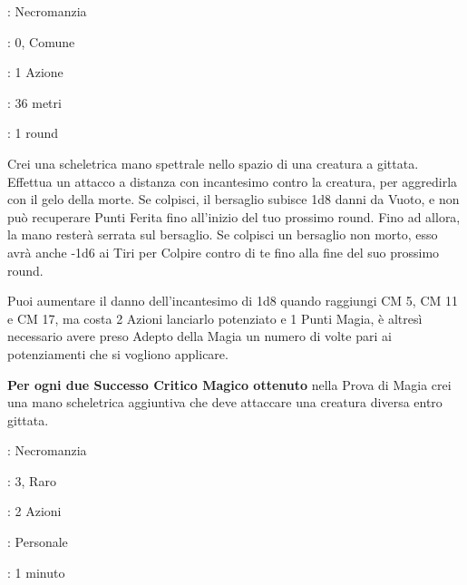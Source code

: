 \begin{multicols}{2}
\noindent\colorbox{OBSSgold!10}{
\begin{minipage}{0.95\linewidth}
\begin{description}[noitemsep, topsep=0pt, parsep=0pt, partopsep=0pt, leftmargin=0cm, labelwidth=1.3cm]
	\item[\textbf{Lista}]: Necromanzia
	\item[\textbf{Livello}]: 0, Comune
	\item[\textbf{Lancio}]: 1 Azione
	\item[\textbf{Gittata}]: 36 metri
	\item[\textbf{Durata}]: 1 round
\end{description}
\end{minipage}}\smallskip

Crei una scheletrica mano spettrale nello spazio di una creatura a gittata. Effettua un attacco a distanza con incantesimo contro la creatura, per aggredirla con il gelo della morte. Se colpisci, il bersaglio subisce 1d8 danni da Vuoto, e non può recuperare Punti Ferita fino all'inizio del tuo prossimo round. Fino ad allora, la mano resterà serrata sul bersaglio. Se colpisci un bersaglio non morto, esso avrà anche -1d6 ai Tiri per Colpire contro di te fino alla fine del suo prossimo round.

Puoi aumentare il danno dell'incantesimo di 1d8 quando raggiungi CM 5, CM 11 e CM 17, ma costa 2 Azioni lanciarlo potenziato e 1 Punti Magia, è altresì necessario avere preso Adepto della Magia un numero di volte pari ai potenziamenti che si vogliono applicare.

\textbf{Per ogni due Successo Critico Magico ottenuto} nella Prova di Magia crei una mano scheletrica aggiuntiva che deve attaccare una creatura diversa entro gittata.

\noindent\colorbox{OBSSgold!10}{
\begin{minipage}{0.95\linewidth}
\begin{description}[noitemsep, topsep=0pt, parsep=0pt, partopsep=0pt, leftmargin=0cm, labelwidth=1.3cm]
	\item[\textbf{Lista}]: Necromanzia
	\item[\textbf{Livello}]: 3, Raro
	\item[\textbf{Lancio}]: 2 Azioni
	\item[\textbf{Gittata}]: Personale
	\item[\textbf{Durata}]: 1 minuto
\end{description}
\end{minipage}}\smallskip


\end{multicols}

